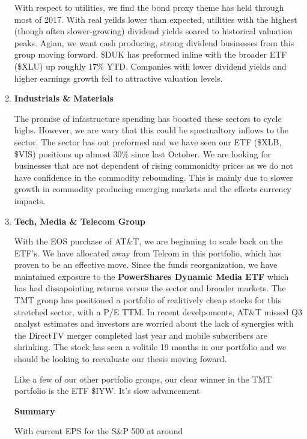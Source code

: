 \documentclass[11pt,pressrelease]{newlfm} %
\begin{document}
\begin{newlfm}
\begin{singlespace}
\begin{enumerate}
With respect to utilities, we find the bond proxy theme has held through most of 2017. With real yeilds lower than expected, utilities with the highest (though often slower-growing) dividend yields soared to historical valuation peaks. Agian, we want cash producing, strong dividend businesses from this group moving forward. \$DUK has preformed inline with the broader ETF (\$XLU) up roughly 17\% YTD. Companies with lower dividend yields and higher earnings growth fell to attractive valuation levels.

\item \textbf{Industrials \& Materials} \par
The promise of infastructure spending has boosted these sectors to cycle highs. However, we are wary that this could be spectualtory inflows to the sector. The sector has out preformed and we have seen our ETF (\$XLB, \$VIS) positions up almost 30\% since last October. We are looking for businesses that are not dependent of rising commonidty prices as we do not have confidence in the commodity rebounding. This is mainly due to slower growth in commodity producing emerging markets and the effects currency impacts.

\item \textbf{Tech, Media \& Telecom Group} \par
With the EOS purchase of AT\&T, we are beginning to scale back on the ETF's. We have allocated away from Telcom in this portfolio, which has proven to be an effective move. Since the funds reorganization, we have maintained exposure to the \textbf{PowerShares Dynamic Media ETF} which has had dissapointing returns versus the sector and broader markets. The TMT group has positioned a portfolio of realitively cheap stocks for this stretched sector, with a P/E TTM.
In recent develpoments, AT\&T missed Q3 analyst estimates and investors are worried about the lack of synergies with the DirectTV merger completed last year and mobile subscribers are shrinking. The stock has seen a volitile 19 months in our portfolio and we should be looking to reevaluate our thesis moving foward.

Like a few of our other portfolio groups, our clear winner in the TMT portfolio is the ETF \$IYW. It's slow advancement 


\center \textbf{Summary} \par
\raggedright
With current EPS for the S\&P 500 at around %



\end{enumerate}
\end{singlespace}
\end{newlfm}
\end{document}
